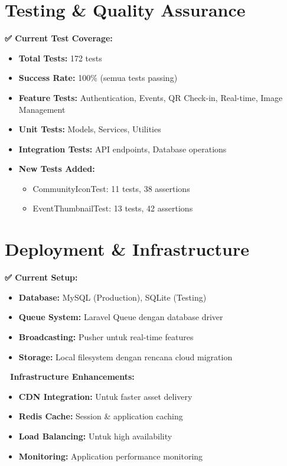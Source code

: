 \documentclass[12pt,a4paper]{article}
\begin{document}
\section{Testing \& Quality Assurance}

\begin{implemented}
\textbf{✅ Current Test Coverage:}
\begin{itemize}
    \item \textbf{Total Tests:} 172 tests
    \item \textbf{Success Rate:} 100\% (semua tests passing)
    \item \textbf{Feature Tests:} Authentication, Events, QR Check-in, Real-time, Image Management
    \item \textbf{Unit Tests:} Models, Services, Utilities
    \item \textbf{Integration Tests:} API endpoints, Database operations
    \item \textbf{New Tests Added:}
    \begin{itemize}
        \item CommunityIconTest: 11 tests, 38 assertions
        \item EventThumbnailTest: 13 tests, 42 assertions
    \end{itemize}
\end{itemize}
\end{implemented}

\section{Deployment \& Infrastructure}

\begin{implemented}
\textbf{✅ Current Setup:}
\begin{itemize}
    \item \textbf{Database:} MySQL (Production), SQLite (Testing)
    \item \textbf{Queue System:} Laravel Queue dengan database driver
    \item \textbf{Broadcasting:} Pusher untuk real-time features
    \item \textbf{Storage:} Local filesystem dengan rencana cloud migration
\end{itemize}
\end{implemented}

\begin{planned}
\textbf{🔄 Infrastructure Enhancements:}
\begin{itemize}
    \item \textbf{CDN Integration:} Untuk faster asset delivery
    \item \textbf{Redis Cache:} Session \& application caching
    \item \textbf{Load Balancing:} Untuk high availability
    \item \textbf{Monitoring:} Application performance monitoring
\end{itemize}
\end{planned}
\end{document}
